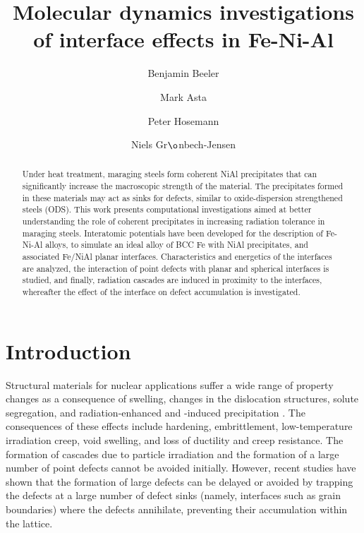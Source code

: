 \documentclass[review]{elsarticle}
\begin{document}
\begin{frontmatter}
\title{Molecular dynamics investigations of interface effects in Fe-Ni-Al}

\author[davisa,berka]{Benjamin Beeler}
\author[berka]{Mark Asta}
\author[berkb]{Peter Hosemann}
\author[davisa,davisb]{Niels Gr$\o$nbech-Jensen}
\address[davisa]{Department of Mechanical and Aerospace Engineering, University of California, Davis, CA 95616}
\address[berka]{Department of Materials Science, University of California, Berkeley, CA 94720}
\address[berkb]{Department of Nuclear Engineering, University of California, Berkeley, CA 94720}
\address[davisb]{Department of Mathematics, University of California, Davis, CA 95616}

\begin{abstract}
Under heat treatment, maraging steels form coherent NiAl precipitates that can significantly increase the macroscopic strength of the material.  The precipitates formed in these materials may act as sinks for defects, similar to oxide-dispersion strengthened steels (ODS).  This work presents computational investigations aimed at better understanding the role of coherent precipitates in increasing radiation tolerance in maraging steels.  Interatomic potentials have been developed for the description of Fe-Ni-Al alloys, to simulate an ideal alloy of BCC Fe with NiAl precipitates, and associated Fe/NiAl planar interfaces.  Characteristics and energetics of the interfaces are analyzed, the interaction of point defects with planar and spherical interfaces is studied, and finally, radiation cascades are induced in proximity to the interfaces, whereafter the effect of the interface on defect accumulation is investigated.
\end{abstract}
\end{frontmatter}

\linenumbers

\section{Introduction}

Structural materials for nuclear applications suffer a wide range of property changes as a consequence of swelling, changes in the dislocation structures, solute segregation, and radiation-enhanced and -induced precipitation \cite{odette2008,olander,stiegler1979,was2007}.  The consequences of these effects include hardening, embrittlement, low-temperature irradiation creep, void swelling, and loss of ductility and creep resistance.  The formation of cascades due to particle irradiation and the formation of a large number of point defects cannot be avoided initially.  However, recent studies have shown that the formation of large defects can be delayed or avoided by trapping the defects at a large number of defect sinks (namely, interfaces such as grain boundaries) where the defects annihilate, preventing their accumulation within the lattice.  
\end{document}
